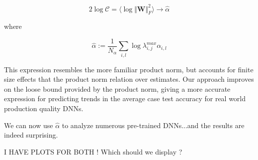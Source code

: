 $$2\log\mathcal{C}=\langle\log\Vert\mathbf{W}\Vert^{2}_{F}\rangle\rightarrow\hat{\alpha}$$ 

where

$$\hat{\alpha}:=\dfrac{1}{N_{\alpha}}\sum_{i,l}\log\lambda^{max}_{i,j}\alpha_{i,l}$$

This expression resembles the more familiar product norm, but accounts for finite size effects that the product norm relation over estimates.
Our approach improves on the loose bound provided by the product norm, giving a more accurate expression for predicting trends
in the average case test accuracy for real world production quality DNNs.

We can now use $\hat{\alpha}$ to analyze numerous pre-trained DNNs...and the results are indeed surprising.

I HAVE PLOTS FOR BOTH !
Which should we display ?  

